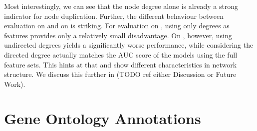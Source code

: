 \documentclass[
	fontsize=10pt, %
	twoside=false, %
	secnumdepth=1, %
  toc=indentunnumbered %
]{kaobook}
\begin{document}
Most interestingly, we can see that the node degree alone is already a strong
indicator for node duplication. Further, the different behaviour between
evaluation on \PDMap and on \ReconMap is striking. 
For evaluation on \PDMap, using only degrees as
features provides only a relatively small disadvantage. On \ReconMap, however,
using undirected degrees yields a significantly worse performance, while
considering the directed degree actually matches the AUC score of the models
using the full feature sets. This hints at that \PDMap and \ReconMap show
different characteristics in network structure. We discuss this further in (TODO
ref either Discussion or Future Work).


\section{Gene Ontology Annotations}
\label{sec:gene-ontology-annotations}




\end{document}
